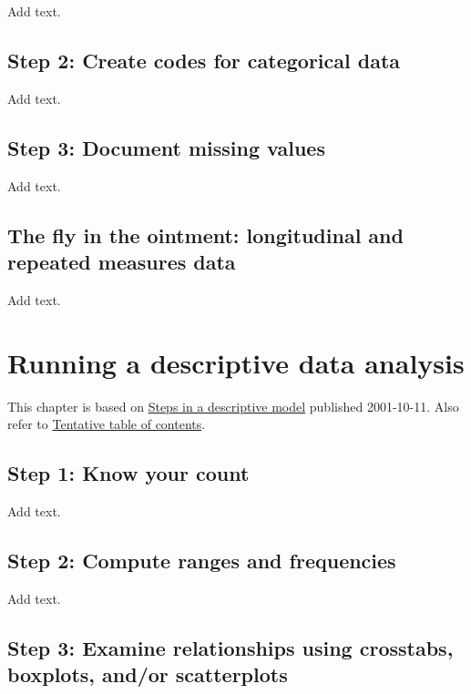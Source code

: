 \documentclass[
  letterpaper,
  DIV=11,
  numbers=noendperiod]{scrreprt}
\begin{document}
Add text.

\section{Step 2: Create codes for categorical
data}\label{step-2-create-codes-for-categorical-data}

Add text.

\section{Step 3: Document missing
values}\label{step-3-document-missing-values}

Add text.

\section{The fly in the ointment: longitudinal and repeated measures
data}\label{the-fly-in-the-ointment-longitudinal-and-repeated-measures-data}

Add text.


\chapter{Running a descriptive data
analysis}\label{running-a-descriptive-data-analysis}

This chapter is based on
\href{http://new.pmean.com/steps-in-descriptive-model/}{Steps in a
descriptive model} published 2001-10-11. Also refer to
\href{http://www.pmean.com/10/Contents.html}{Tentative table of
contents}.

\section{Step 1: Know your count}\label{step-1-know-your-count}

Add text.

\section{Step 2: Compute ranges and
frequencies}\label{step-2-compute-ranges-and-frequencies}

Add text.

\section{Step 3: Examine relationships using crosstabs, boxplots, and/or
scatterplots}\label{step-3-examine-relationships-using-crosstabs-boxplots-andor-scatterplots}
\end{document}
